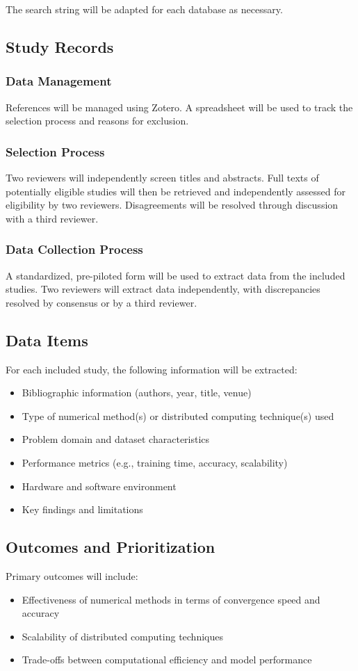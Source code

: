 \documentclass[a4paper,12pt]{article}
\begin{document}
The search string will be adapted for each database as necessary.

\subsection{Study Records}
\subsubsection{Data Management}
References will be managed using Zotero. A spreadsheet will be used to track the selection process and reasons for exclusion.

\subsubsection{Selection Process}
Two reviewers will independently screen titles and abstracts. Full texts of potentially eligible studies will then be retrieved and independently assessed for eligibility by two reviewers. Disagreements will be resolved through discussion with a third reviewer.

\subsubsection{Data Collection Process}
A standardized, pre-piloted form will be used to extract data from the included studies. Two reviewers will extract data independently, with discrepancies resolved by consensus or by a third reviewer.

\subsection{Data Items}
For each included study, the following information will be extracted:
\begin{itemize}
    \item Bibliographic information (authors, year, title, venue)
    \item Type of numerical method(s) or distributed computing technique(s) used
    \item Problem domain and dataset characteristics
    \item Performance metrics (e.g., training time, accuracy, scalability)
    \item Hardware and software environment
    \item Key findings and limitations
\end{itemize}

\subsection{Outcomes and Prioritization}
Primary outcomes will include:
\begin{itemize}
    \item Effectiveness of numerical methods in terms of convergence speed and accuracy
    \item Scalability of distributed computing techniques
    \item Trade-offs between computational efficiency and model performance
\end{itemize}
\end{document}
